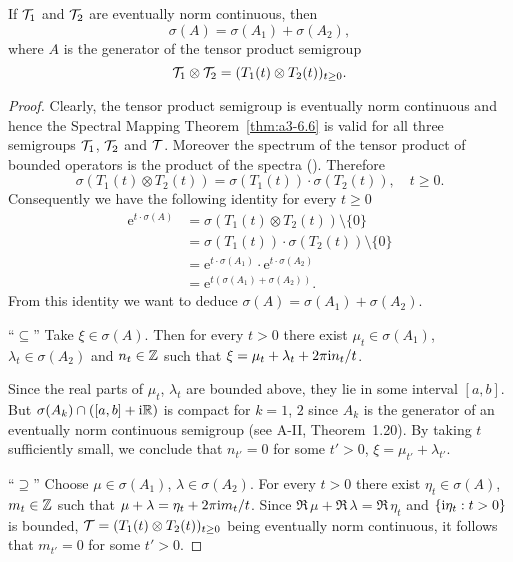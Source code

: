 \begin{corollary}\label{cor:a3-6.8}
If $\mathcal{T}_{1}$ and $\mathcal{T}_{2}$ are eventually norm continuous, then
\[
	\sigma(A) = \sigma(A_{1}) + \sigma(A_{2}) ,
\]
where $A$ is the generator of the tensor product semigroup
\[
	\mathcal{T}_{1} \otimes \mathcal{T}_{2} = (T_{1}(t) \otimes T_{2}(t))_{t\geq 0} .
\]
\end{corollary}
\begin{proof}
Clearly, the tensor product semigroup is eventually norm continuous and hence the Spectral Mapping Theorem~\ref{thm:a3-6.6} is valid for all three semigroups $\mathcal{T}_{1}$, $\mathcal{T}_{2}$ and $\mathcal{T}$.
Moreover the spectrum of the tensor product of bounded operators is the product of the spectra 
(\citet[XIII.9]{reedsimon:1978}).
Therefore
\[
	\sigma(T_{1}(t)\otimes T_{2}(t)) = \sigma(T_{1}(t))\cdot\sigma(T_{2}(t)), \quad t \geq 0 .
\]
Consequently we have the following identity for every $t \geq 0$ 
\begin{align*}
\mathrm{e}^{t\cdot\sigma(A)} &= \sigma(T_{1}(t)\otimes T_{2}(t)) \setminus \{0\} \\
&= \sigma(T_{1}(t))\cdot\sigma(T_{2}(t)) \setminus \{0\} \\
&= \mathrm{e}^{t\cdot\sigma(A_{1})}\cdot \mathrm{e}^{t\cdot\sigma(A_{2})} \\
&= \mathrm{e}^{t(\sigma(A_{1})+\sigma(A_{2}))} .
\end{align*}
From this identity we want to deduce $\sigma(A) = \sigma(A_{1}) + \sigma(A_{2})$.

\enquote{$\subseteq$}\quad 
Take $\xi \in \sigma(A)$.
Then for every $t > 0$ there exist $\mu_{t} \in \sigma(A_{1})$, $\lambda_{t} \in \sigma(A_{2})$ and $n_{t} \in \mathbb{Z}$ such that $\xi = \mu_{t} + \lambda_{t} + 2\pi\mathrm{i}  n_{t}/t$.

Since the real parts of $\mu_{t}$, $\lambda_{t}$ are bounded above, they lie in some interval $[a,b]$.
But $\sigma(A_{k}) \cap ( [a,b] + \mathrm{i} \mathbb{R} )$ is compact for $k = 1$, $2$  since $A_{k}$ is the generator of an eventually norm continuous semigroup (see A-II, Theorem~1.20).
By taking $t$ sufficiently small, we conclude that $n_{t'} = 0$ for some $t' > 0$, \ie $\xi = \mu_{t'} + \lambda_{t'}$.

\enquote{$\supseteq$}\quad 
Choose $\mu \in \sigma(A_{1})$, $\lambda \in \sigma(A_{2})$.
For every $t > 0$ there exist $\eta_{t} \in \sigma(A)$, $m_{t} \in \mathbb{Z}$ such that $\mu + \lambda = \eta_{t} + 2\pi \mathrm{i} m_{t}/t$.
Since $\Re\,\mu + \Re\,\lambda = \Re\,\eta_{t}$ and $\{\mathrm{i} \eta_{t}: t > 0\}$ is bounded, 
$\mathcal{T} = (T_{1}(t) \otimes T_{2}(t))_{t\geq 0}$ being eventually norm continuous, it follows that $m_{t'} = 0$ for some $t' > 0$.
\end{proof}
